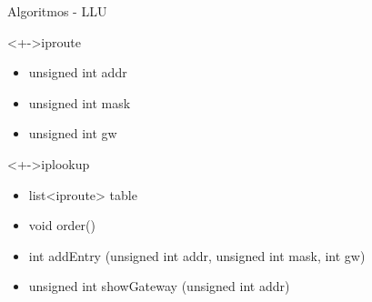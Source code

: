 \documentclass[xcolor=dvipsnames]{beamer}
\begin{document}
\begin{frame}{Algoritmos - LLU}
\begin{block}<+->{iproute}   
    \begin{itemize}
      \scriptsize
     	\item unsigned int addr
     	\item unsigned int mask
     	\item unsigned int gw
    \end{itemize}
  \end{block}

\begin{block}<+->{iplookup}   
    \begin{itemize}
      \scriptsize
     	\item list<iproute> table
	\item void order()
	\item int addEntry (unsigned int addr, unsigned int mask, int gw)
	\item unsigned int showGateway (unsigned int addr)
    \end{itemize}
  \end{block}
\end{frame}
	
\end{document}
